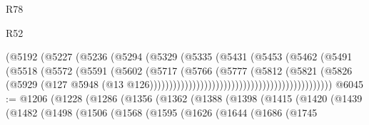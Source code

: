 \begin{lexlean}{R78}
\begin{lexlean}{R52}
\begin{coremodule}
{{{{{{{{{{{{{{{{{{{{{{{{{{{{{{{{{{{{{{{{{{{{{{{{{{{{{{{{{{{{{{{{{{{{{{{{{{{{{{{{{{{{{{{{{{{{{{{{{{{{{{{{{{{{{{{{{{{{{{{{{{{{{{{{{{{{{{{{{{{{{{{{{{{{{{{{{{{{{{{{{{{{{{{{{{{{{{{{{{{{{{{{{{{{{{{{{{{{{{                                                    (@5192
                                                      (@5227
                                                        (@5236
                                                          (@5294
                                                            (@5329
                                                              (@5335
                                                                (@5431
                                                                  (@5453
                                                                    (@5462
                                                                      (@5491
                                                                        (@5518
                                                                          (@5572
                                                                            (@5591
                                                                              (@5602
                                                                                (@5717
                                                                                  (@5766
                                                                                    (@5777
                                                                                      (@5812
                                                                                        (@5821
                                                                                          (@5826
                                                                                            (@5929
                                                                                              (@127
                                                                                                @5948
                                                                                                (@13
                                                                                                  @126)))))))))))))))))))))))))))))))))))))))))))))))
@6045 := @1206
    (@1228
      (@1286
        (@1356
          (@1362
            (@1388
              (@1398
                (@1415
                  (@1420
                    (@1439
                      (@1482
                        (@1498
                          (@1506
                            (@1568
                              (@1595
                                (@1626
                                  (@1644
                                    (@1686
                                      (@1745
}}}}}}}}}}}}}}}}}}}}}}}}}}}}}}}}}}}}}}}}}}}}}}}}}}}}}}}}}}}}}}}}}}}}}}}}}}}}}}}}}}}}}}}}}}}}}}}}}}}}}}}}}}}}}}}}}}}}}}}}}}}}}}}}}}}}}}}}}}}}}}}}}}}}}}}}}}}}}}}}}}}}}}}}}}}}}}}}}}}}}}}}}}}}}}}}}}}}}}
\end{coremodule}
\end{lexlean}
\end{lexlean}
